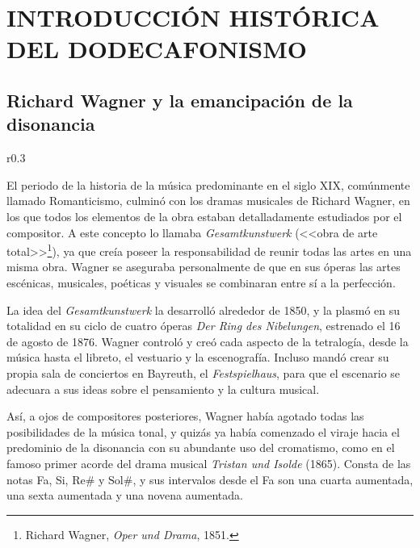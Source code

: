 \chapter[INTRODUCCIÓN HISTÓRICA DEL DODECAFONISMO]{INTRODUCCIÓN HISTÓRICA DEL DODECAFONISMO}\label{ch:historia}
	\section{Richard Wagner y la emancipación de la disonancia}
		\begin{wrapfigure}{r}{0.3\textwidth}
			\captionsetup{justification=centering, font=footnotesize}
			\vspace{-\bigskipamount}
		\end{wrapfigure}
		El periodo de la historia de la música predominante en el siglo XIX, comúnmente llamado Romanticismo, culminó con los dramas musicales de Richard Wagner, en los que todos los elementos de la obra estaban detalladamente estudiados por el compositor. A este concepto lo llamaba \emph{Gesamtkunstwerk} (<<obra de arte total>>\footnote{Richard Wagner, \emph{Oper und Drama}, 1851.}), ya que creía poseer la responsabilidad de reunir todas las artes en una misma obra. Wagner se aseguraba personalmente de que en sus óperas las artes escénicas, musicales, poéticas y visuales se combinaran entre sí a la perfección.
	
		La idea del \emph{Gesamtkunstwerk} la desarrolló alrededor de 1850, y la plasmó en su totalidad en su ciclo de cuatro óperas \emph{Der Ring des Nibelungen}, estrenado el 16 de agosto de 1876. Wagner controló y creó cada aspecto de la tetralogía, desde la música hasta el libreto, el vestuario y la escenografía. Incluso mandó crear su propia sala de conciertos en Bayreuth, el \emph{Festspielhaus}, para que el escenario se adecuara a sus ideas sobre el pensamiento y la cultura musical.
	
		Así, a ojos de compositores posteriores, Wagner había agotado todas las posibilidades de la música tonal, y quizás ya había comenzado el viraje hacia el predominio de la disonancia con su abundante uso del cromatismo, como en el famoso primer acorde del drama musical \emph{Tristan und Isolde} (1865). Consta de las notas Fa, Si, $\text{Re\#}$ y $\text{Sol\#}$, y sus intervalos desde el Fa son una cuarta aumentada, una sexta aumentada y una novena aumentada.
		
